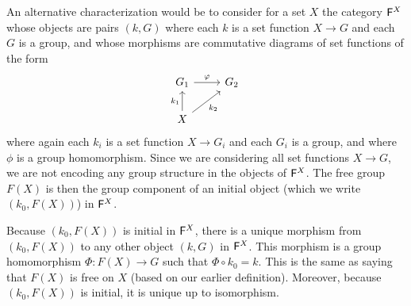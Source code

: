 \begin{remark}
    An alternative characterization would be to consider for a set \(X\) the
    category \(\mathsf{F}^X\) whose objects are pairs \((k, G)\) where each \(k\)
    is a set function \(X \to G\) and each \(G\) is a group, and whose morphisms
    are commutative diagrams of set functions of the form
    \[
        \begin{tikzcd}
            G_1 \arrow[r, "\phi"]                 & G_2 \\
            X \arrow[u, "k_1"] \arrow[ru, "k_2"'] &    
        \end{tikzcd}
    \]
    where again each \(k_i\) is a set function \(X \to G_i\) and each \(G_i\) is
    a group, and where \(\phi\) is a group homomorphism. Since we are
    considering all set functions \(X \to G\), we are not encoding any group
    structure in the objects of \(\mathsf{F}^X\). The free group \(F(X)\) is then
    the group component of an initial object (which we write \((k_0, F(X))\)) in
    \(\mathsf{F}^X\).

    Because \((k_0, F(X))\) is initial in \(\mathsf{F}^X\), there is a unique
    morphism from \((k_0, F(X))\) to any other object \((k, G)\) in
    \(\mathsf{F}^X\). This morphism is a group homomorphism \(\Phi: F(X) \to G\)
    such that \(\Phi \circ k_0 = k\). This is the same as saying that \(F(X)\)
    is free on \(X\) (based on our earlier definition). Moreover, because
    \((k_0, F(X))\) is initial, it is unique up to isomorphism.
\end{remark}


